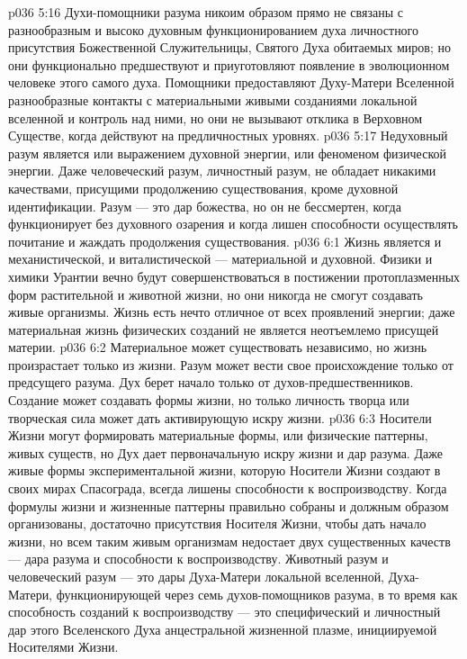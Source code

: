 \vs p036 5:16 Духи\hyp{}помощники разума никоим образом прямо не связаны с разнообразным и высоко духовным функционированием духа личностного присутствия Божественной Служительницы, Святого Духа обитаемых миров; но они функционально предшествуют и приуготовляют появление в эволюционном человеке этого самого духа. Помощники предоставляют Духу\hyp{}Матери Вселенной разнообразные контакты с материальными живыми созданиями локальной вселенной и контроль над ними, но они не вызывают отклика в Верховном Существе, когда действуют на предличностных уровнях.
\vs p036 5:17 \pc Недуховный разум является или выражением духовной энергии, или феноменом физической энергии. Даже человеческий разум, личностный разум, не обладает никакими качествами, присущими продолжению существования, кроме духовной идентификации. Разум --- это дар божества, но он не бессмертен, когда функционирует без духовного озарения и когда лишен способности осуществлять почитание и жаждать продолжения существования.
\vs p036 6:1 Жизнь является и механистической, и виталистической --- материальной и духовной. Физики и химики Урантии вечно будут совершенствоваться в постижении протоплазменных форм растительной и животной жизни, но они никогда не смогут создавать живые организмы. Жизнь есть нечто отличное от всех проявлений энергии; даже материальная жизнь физических созданий не является неотъемлемо присущей материи.
\vs p036 6:2 Материальное может существовать независимо, но жизнь произрастает только из жизни. Разум может вести свое происхождение только от предсущего разума. Дух берет начало только от духов\hyp{}предшественников. Создание может создавать формы жизни, но только личность творца или творческая сила может дать активирующую искру жизни.
\vs p036 6:3 Носители Жизни могут формировать материальные формы, или физические паттерны, живых существ, но Дух дает первоначальную искру жизни и дар разума. Даже живые формы экспериментальной жизни, которую Носители Жизни создают в своих мирах Спасограда, всегда лишены способности к воспроизводству. Когда формулы жизни и жизненные паттерны правильно собраны и должным образом организованы, достаточно присутствия Носителя Жизни, чтобы дать начало жизни, но всем таким живым организмам недостает двух существенных качеств --- дара разума и способности к воспроизводству. Животный разум и человеческий разум --- это дары Духа\hyp{}Матери локальной вселенной, Духа\hyp{}Матери, функционирующей через семь духов\hyp{}помощников разума, в то время как способность созданий к воспроизводству --- это специфический и личностный дар этого Вселенского Духа анцестральной жизненной плазме, инициируемой Носителями Жизни.
